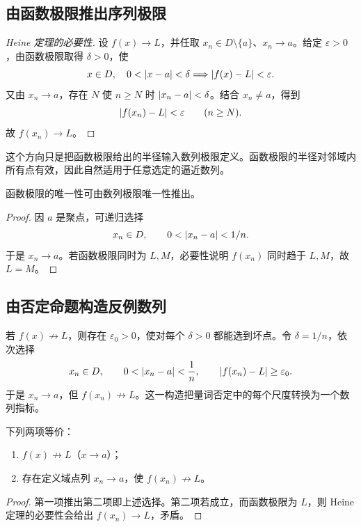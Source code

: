 \subsection{由函数极限推出序列极限}

\begin{proof}[Heine 定理的必要性]
设 \(f(x)\to L\)，并任取 \(x_n\in D\setminus\{a\}\)、\(x_n\to a\)。给定 \(\varepsilon>0\)，由函数极限取得 \(\delta>0\)，使
\[
 x\in D,\quad0<\left|x-a\right|<\delta
 \Longrightarrow\left|f(x)-L\right|<\varepsilon.
\]
又由 \(x_n\to a\)，存在 \(N\) 使 \(n\ge N\) 时 \(\left|x_n-a\right|<\delta\)。结合 \(x_n\ne a\)，得到
\[
 \left|f(x_n)-L\right|<\varepsilon\qquad(n\ge N).
\]
故 \(f(x_n)\to L\)。
\end{proof}

这个方向只是把函数极限给出的半径输入数列极限定义。函数极限的半径对邻域内所有点有效，因此自然适用于任意选定的逼近数列。

\begin{corollary}
函数极限的唯一性可由数列极限唯一性推出。
\end{corollary}

\begin{proof}
因 \(a\) 是聚点，可递归选择
\[
 x_n\in D,\qquad0<\left|x_n-a\right|<1/n.
\]
于是 \(x_n\to a\)。若函数极限同时为 \(L,M\)，必要性说明 \(f(x_n)\) 同时趋于 \(L,M\)，故 \(L=M\)。
\end{proof}

\subsection{由否定命题构造反例数列}

若 \(f(x)\not\to L\)，则存在 \(\varepsilon_0>0\)，使对每个 \(\delta>0\) 都能选到坏点。令 \(\delta=1/n\)，依次选择
\[
 x_n\in D,\qquad
 0<\left|x_n-a\right|<\frac1n,\qquad
 \left|f(x_n)-L\right|\ge\varepsilon_0.
\]
于是 \(x_n\to a\)，但 \(f(x_n)\not\to L\)。这一构造把量词否定中的每个尺度转换为一个数列指标。

\begin{lemma}[坏点数列]
下列两项等价：
\begin{enumerate}
 \item \(f(x)\not\to L\)（\(x\to a\)）；
 \item 存在定义域点列 \(x_n\to a\)，使 \(f(x_n)\not\to L\)。
\end{enumerate}
\end{lemma}

\begin{proof}
第一项推出第二项即上述选择。第二项若成立，而函数极限为 \(L\)，则 Heine 定理的必要性会给出 \(f(x_n)\to L\)，矛盾。
\end{proof}

